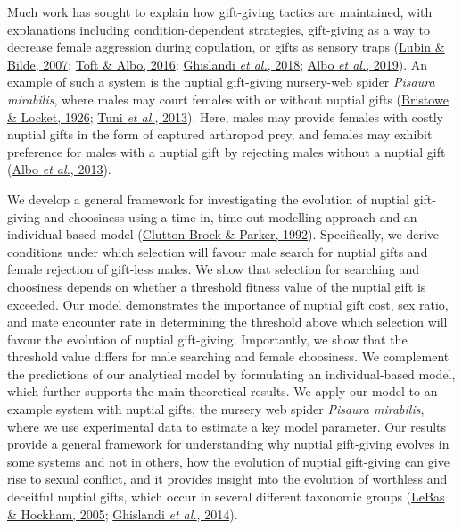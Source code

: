 \documentclass[
]{article}
\begin{document}
Much work has sought to explain how gift-giving tactics are maintained,
with explanations including condition-dependent strategies, gift-giving
as a way to decrease female aggression during copulation, or gifts as
sensory traps (\protect\hyperlink{ref-Lubin2007}{Lubin \& Bilde, 2007};
\protect\hyperlink{ref-Toft2016}{Toft \& Albo, 2016};
\protect\hyperlink{ref-Ghislandi2018}{Ghislandi \emph{et al.}, 2018};
\protect\hyperlink{ref-Albo2019}{Albo \emph{et al.}, 2019}). An example
of such a system is the nuptial gift-giving nursery-web spider
\emph{Pisaura mirabilis}, where males may court females with or without
nuptial gifts (\protect\hyperlink{ref-Bristowe1926}{Bristowe \& Locket,
1926}; \protect\hyperlink{ref-Tuni2013a}{Tuni \emph{et al.}, 2013}).
Here, males may provide females with costly nuptial gifts in the form of
captured arthropod prey, and females may exhibit preference for males
with a nuptial gift by rejecting males without a nuptial gift
(\protect\hyperlink{ref-Albo2013}{Albo \emph{et al.}, 2013}).

We develop a general framework for investigating the evolution of
nuptial gift-giving and choosiness using a time-in, time-out modelling
approach and an individual-based model
(\protect\hyperlink{ref-Clutton-Brock1992}{Clutton-Brock \& Parker,
1992}). Specifically, we derive conditions under which selection will
favour male search for nuptial gifts and female rejection of gift-less
males. We show that selection for searching and choosiness depends on
whether a threshold fitness value of the nuptial gift is exceeded. Our
model demonstrates the importance of nuptial gift cost, sex ratio, and
mate encounter rate in determining the threshold above which selection
will favour the evolution of nuptial gift-giving. Importantly, we show
that the threshold value differs for male searching and female
choosiness. We complement the predictions of our analytical model by
formulating an individual-based model, which further supports the main
theoretical results. We apply our model to an example system with
nuptial gifts, the nursery web spider \emph{Pisaura mirabilis}, where we
use experimental data to estimate a key model parameter. Our results
provide a general framework for understanding why nuptial gift-giving
evolves in some systems and not in others, how the evolution of nuptial
gift-giving can give rise to sexual conflict, and it provides insight
into the evolution of worthless and deceitful nuptial gifts, which occur
in several different taxonomic groups
(\protect\hyperlink{ref-LeBas2005}{LeBas \& Hockham, 2005};
\protect\hyperlink{ref-Ghislandi2014}{Ghislandi \emph{et al.}, 2014}).
\end{document}
